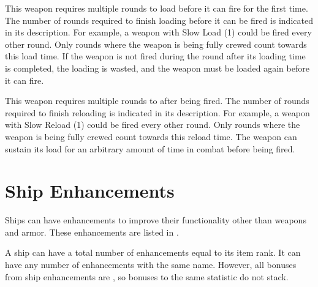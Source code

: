      This weapon requires multiple rounds to load before it can fire for the first time.
    The number of rounds required to finish loading before it can be fired is indicated in its description.
    For example, a weapon with Slow Load (1) could be fired every other round.
    Only rounds where the weapon is being fully crewed count towards this load time.
    If the weapon is not fired during the round after its loading time is completed, the loading is wasted, and the weapon must be loaded again before it can fire.

     This weapon requires multiple rounds to after being fired.
    The number of rounds required to finish reloading is indicated in its description.
    For example, a weapon with Slow Reload (1) could be fired every other round.
    Only rounds where the weapon is being fully crewed count towards this reload time.
    The weapon can sustain its load for an arbitrary amount of time in combat before being fired.

\section{Ship Enhancements}\label{Ship Enhancements}
  Ships can have enhancements to improve their functionality other than weapons and armor.
  These enhancements are listed in .

  A ship can have a total number of enhancements equal to its item rank.
  It can have any number of enhancements with the same name.
  However, all bonuses from ship enhancements are , so bonuses to the same statistic do not stack.

